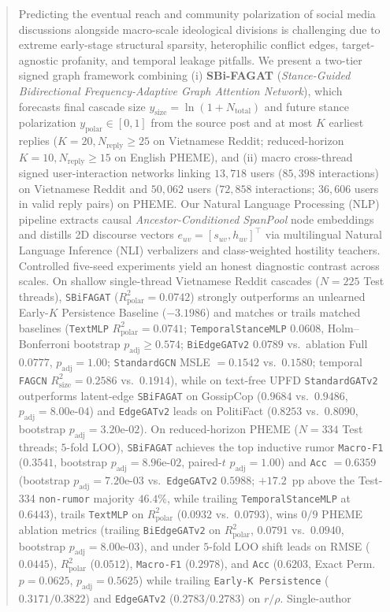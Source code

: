 \documentclass[conference]{IEEEtran}
\begin{document}
\begin{abstract}
Predicting the eventual reach and community polarization of social media discussions alongside macro-scale ideological divisions is challenging due to extreme early-stage structural sparsity, heterophilic conflict edges, target-agnostic profanity, and temporal leakage pitfalls. We present a two-tier signed graph framework combining (i) \textbf{SBi-FAGAT} (\emph{Stance-Guided Bidirectional Frequency-Adaptive Graph Attention Network}), which forecasts final cascade size $y_{\text{size}} = \ln(1 + N_{\text{total}})$ and future stance polarization $y_{\text{polar}} \in [0, 1]$ from the source post and at most $K$ earliest replies ($K=20, N_{\text{reply}} \ge 25$ on Vietnamese Reddit; reduced-horizon $K=10, N_{\text{reply}} \ge 15$ on English PHEME), and (ii) macro cross-thread signed user-interaction networks linking $13{,}718$ users ($85{,}398$ interactions) on Vietnamese Reddit and $50{,}062$ users ($72{,}858$ interactions; $36{,}606$ users in valid reply pairs) on PHEME. Our Natural Language Processing (NLP) pipeline extracts causal \emph{Ancestor-Conditioned SpanPool} node embeddings and distills 2D discourse vectors $e_{uv} = [s_{uv}, h_{uv}]^\top$ via multilingual Natural Language Inference (NLI) verbalizers and class-weighted hostility teachers. Controlled five-seed experiments yield an honest diagnostic contrast across scales. On shallow single-thread Vietnamese Reddit cascades ($N = 225$ Test threads), \texttt{SBiFAGAT} ($R^2_{\text{polar}} = 0.0742$) strongly outperforms an unlearned Early-$K$ Persistence Baseline ($-3.1986$) and matches or trails matched baselines (\texttt{TextMLP} $R^2_{\text{polar}} = 0.0741$; \texttt{TemporalStanceMLP} $0.0608$, Holm--Bonferroni bootstrap $p_{\text{adj}} \ge 0.574$; \texttt{BiEdgeGATv2} $0.0789$ vs.\ ablation Full $0.0777$, $p_{\text{adj}} = 1.00$; \texttt{StandardGCN} MSLE $= 0.1542$ vs.\ $0.1580$; temporal \texttt{FAGCN} $R^2_{\text{size}} = 0.2586$ vs.\ $0.1914$), while on text-free UPFD \texttt{StandardGATv2} outperforms latent-edge \texttt{SBiFAGAT} on GossipCop ($0.9684$ vs.\ $0.9486$, $p_{\text{adj}} = 8.00\text{e-}04$) and \texttt{EdgeGATv2} leads on PolitiFact ($0.8253$ vs.\ $0.8090$, bootstrap $p_{\text{adj}} = 3.20\text{e-}02$). On reduced-horizon PHEME ($N = 334$ Test threads; $5$-fold LOO), \texttt{SBiFAGAT} achieves the top inductive rumor \texttt{Macro-F1} ($0.3541$, bootstrap $p_{\text{adj}} = 8.96\text{e-}02$, paired-$t$ $p_{\text{adj}} = 1.00$) and \texttt{Acc} $= 0.6359$ (bootstrap $p_{\text{adj}} = 7.20\text{e-}03$ vs.\ \texttt{EdgeGATv2} $0.5988$; $+17.2$~pp above the Test-334 \texttt{non-rumor} majority $46.4\%$, while trailing \texttt{TemporalStanceMLP} at $0.6443$), trails \texttt{TextMLP} on $R^2_{\text{polar}}$ ($0.0932$ vs.\ $0.0793$), wins $0/9$ PHEME ablation metrics (trailing \texttt{BiEdgeGATv2} on $R^2_{\text{polar}}$, $0.0791$ vs.\ $0.0940$, bootstrap $p_{\text{adj}} = 8.00\text{e-}03$), and under $5$-fold LOO shift leads on RMSE ($0.0445$), $R^2_{\text{polar}}$ ($0.0512$), \texttt{Macro-F1} ($0.2978$), and \texttt{Acc} ($0.6203$, Exact Perm.\ $p = 0.0625$, $p_{\text{adj}} = 0.5625$) while trailing \texttt{Early-K Persistence} ($0.3171/0.3822$) and \texttt{EdgeGATv2} ($0.2783/0.2783$) on $r/\rho$. Single-author 
\end{abstract}
\end{document}
